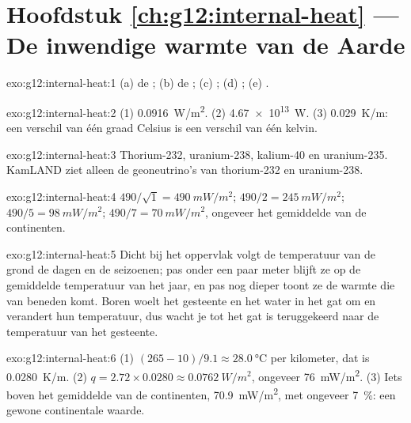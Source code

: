 \section*{Hoofdstuk \ref{ch:g12:internal-heat} --- De inwendige warmte van de Aarde}

\begin{solution}{exo:g12:internal-heat:1}
(a) de ; (b) de ; (c) ;
(d) ; (e) .
\end{solution}

\begin{solution}{exo:g12:internal-heat:2}
(1) \qty{0.0916}{W/m^2}. (2) \qty{4.67e13}{W}. (3) \qty{0.029}{K/m}: een
verschil van één graad Celsius is een verschil van één kelvin.
\end{solution}

\begin{solution}{exo:g12:internal-heat:3}
Thorium-232, uranium-238, kalium-40 en uranium-235. KamLAND ziet alleen de
geoneutrino's van thorium-232 en uranium-238.
\end{solution}

\begin{solution}{exo:g12:internal-heat:4}
$490/\sqrt{1} = \qty{490}{mW/m^2}$; $490/2 = \qty{245}{mW/m^2}$;
$490/5 = \qty{98}{mW/m^2}$; $490/7 = \qty{70}{mW/m^2}$, ongeveer het gemiddelde van de
continenten.
\end{solution}

\begin{solution}{exo:g12:internal-heat:5}
Dicht bij het oppervlak volgt de temperatuur van de grond de dagen en de
seizoenen; pas onder een paar meter blijft ze op de gemiddelde temperatuur van het
jaar, en pas nog dieper toont ze de warmte die van beneden komt.
Boren woelt het gesteente en het water in het gat om en verandert hun
temperatuur, dus wacht je tot het gat is teruggekeerd naar de temperatuur van
het gesteente.
\end{solution}

\begin{solution}{exo:g12:internal-heat:6}
(1) $(265 - 10)/9.1 \approx \qty{28.0}{\celsius}$ per kilometer, dat is
\qty{0.0280}{K/m}. (2) $q = 2.72 \times 0.0280 \approx \qty{0.0762}{W/m^2}$,
ongeveer \qty{76}{mW/m^2}. (3) Iets boven het gemiddelde van de continenten,
\qty{70.9}{mW/m^2}, met ongeveer \qty{7}{\percent}: een gewone continentale waarde.
\end{solution}

